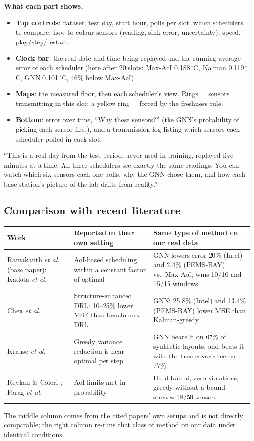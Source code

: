\textbf{What each part shows.}
\begin{itemize}
  \item \textbf{Top controls}: dataset, test day, start hour, polls per slot, which schedulers to compare, how to colour
        sensors (reading, sink error, uncertainty), speed, play/step/restart.
  \item \textbf{Clock bar}: the real date and time being replayed and the running average error of each scheduler (here
        after 20 slots: Max-AoI 0.188\,$^\circ$C, Kalman 0.119\,$^\circ$C, GNN 0.101\,$^\circ$C, 46\% below Max-AoI).
  \item \textbf{Maps}: the measured floor, then each scheduler's view. Rings = sensors transmitting in this slot;
        a yellow ring = forced by the freshness rule.
  \item \textbf{Bottom}: error over time, ``Why these sensors?'' (the GNN's probability of picking each sensor first),
        and a transmission log listing which sensors each scheduler polled in each slot.
\end{itemize}

\begin{saybox}
``This is a real day from the test period, never used in training, replayed five minutes at a time. All three
schedulers see exactly the same readings. You can watch which six sensors each one polls, why the GNN chose them, and
how each base station's picture of the lab drifts from reality.''
\end{saybox}

\subsection{Comparison with recent literature}
\begin{center}
\small
\begin{tabularx}{\textwidth}{@{}p{3cm}XX@{}}
\toprule
\textbf{Work} & \textbf{Reported in their own setting} & \textbf{Same type of method on our real data} \\
\midrule
Ramakanth \emph{et al.}\ \cite{2} (base paper); Kadota \emph{et al.}\ \cite{16} & AoI-based scheduling within a constant factor of optimal & GNN lowers error 20\% (Intel) and 2.4\% (PEMS-BAY) vs.\ Max-AoI; wins 10/10 and 15/15 windows \\
Chen \emph{et al.}\ \cite{8} & Structure-enhanced DRL: 10--25\% lower MSE than benchmark DRL & GNN: 25.8\% (Intel) and 13.4\% (PEMS-BAY) lower MSE than Kalman-greedy \\
Krause \emph{et al.}\ \cite{19} & Greedy variance reduction is near-optimal per step & GNN beats it on 67\% of synthetic layouts, and beats it with the true covariance on 77\% \\
Reyhan \& Coleri \cite{9}; Farag \emph{et al.}\ \cite{7} & AoI limits met in probability & Hard bound, zero violations; greedy without a bound starves 18/50 sensors \\
\bottomrule
\end{tabularx}
\end{center}
The middle column comes from the cited papers' own setups and is not directly comparable; the right column re-runs that
class of method on our data under identical conditions.

